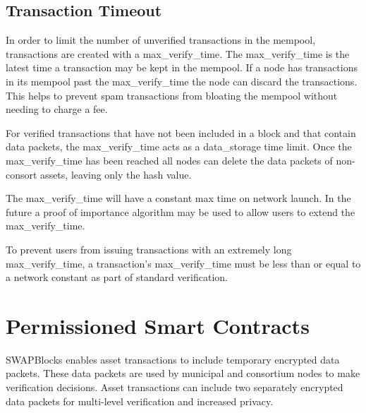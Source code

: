 \documentclass[12pt]{article}
\begin{document}
\subsection{Transaction Timeout}


In order to limit the number of unverified transactions in the mempool, 
transactions are created with a max\_verify\_time.  The max\_verify\_time
is the latest time a transaction may be kept in the mempool.  If a node has 
transactions in its mempool past the max\_verify\_time the node can discard 
the transactions.  This helps to prevent spam transactions from bloating the 
mempool without needing to charge a fee.

For verified transactions 
that have not been included in a block and that contain data packets, the max\_verify\_time
acts as a data\_storage time limit.  Once the max\_verify\_time has been reached all nodes 
can delete the data packets of non-consort assets, leaving only the hash value.

The max\_verify\_time will have a constant max time on network launch.  
In the future a proof of importance algorithm may be used to 
allow users to extend the max\_verify\_time.

To prevent users from issuing transactions with an extremely long max\_verify\_time, a 
transaction's max\_verify\_time
must be less than or equal to a network constant as part of standard verification.

\section{Permissioned Smart Contracts}

SWAPBlocks enables asset transactions to include temporary encrypted data packets. These data
packets are used by municipal and consortium nodes to make verification decisions.  Asset transactions
can include two separately encrypted data packets for multi-level verification and increased privacy.
\end{document}

